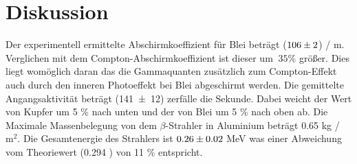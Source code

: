 \section{Diskussion}
\label{sec:Diskussion}
Der experimentell ermittelte Abschirmkoeffizient für Blei beträgt ($\num{106 +- 2}$) / m. Verglichen mit dem Compton-Abschirmkoeffizient ist dieser um $ ~ 35 \% $ größer. Dies liegt womöglich daran das die Gammaquanten zusätzlich zum Compton-Effekt auch durch den inneren Photoeffekt bei Blei abgeschirmt werden. 
Die gemittelte Angangsaktivität beträgt (\num{141 +- 12}) zerfälle die Sekunde. Dabei weicht der Wert von Kupfer um 5 \% nach unten und der von Blei um 5 \% nach oben ab. 
Die Maximale Massenbelegung von dem $\beta$-Strahler in Aluminium beträgt 0.65 kg / $\text{m}^2$. Die Gesamtenergie des Strahlers ist $\num{0.26 +- 0.02}$ MeV was einer Abweichung vom Theoriewert (0.294 \cite{wiki}) von 11 \% entspricht. 
